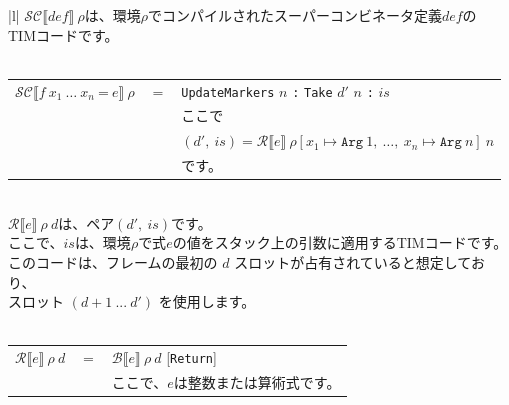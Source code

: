 \documentclass{jbook}
\begin{document}
\begin{tabular} {|l|} \hline
	$\mathcal{SC} \llbracket def \rrbracket ~ \rho$は、環境$\rho$でコンパイルされたスーパーコンビネータ定義$def$の \\
	TIMコードです。                                                                                                \\
	\\
	\begin{tabular}{r c l}
		$\mathcal{SC} \llbracket f ~ x_1 ~ \ldots ~ x_n ~ \texttt{=} ~ e \rrbracket ~ \rho$ & $=$ & \texttt{UpdateMarkers} $n$ \texttt{:} \texttt{Take} $d'$ $n$ \texttt{:} $is$                                                          \\
		                                                                                    &     & ここで                                                                                                                                \\
		                                                                                    &     & $(d', ~ is) = \mathcal{R} \llbracket e \rrbracket ~ \rho[x_1 \mapsto \texttt{Arg} ~ 1, ~ \ldots, ~ x_n \mapsto \texttt{Arg} ~ n] ~ n$ \\
		                                                                                    &     & です。
	\end{tabular}
	\\ \hline
	$\mathcal{R} \llbracket e \rrbracket ~ \rho ~ d$は、ペア$(d', ~ is)$です。                                     \\
	ここで、$is$は、環境$\rho$で式$e$の値をスタック上の引数に適用するTIMコードです。                               \\
	このコードは、フレームの最初の $d$ スロットが占有されていると想定しており、                                    \\
	スロット $(d + 1 ~ ... ~ d')$ を使用します。                                                                   \\
	\\
	\begin{tabular}{r c l}
		$\mathcal{R} \llbracket e \rrbracket ~ \rho ~ d$                 & $=$ & $\mathcal{B} \llbracket e \rrbracket ~ \rho ~ d$ [\texttt{Return}]                                                                            \\
		                                                                 &     & ここで、$e$は整数または算術式です。                                                                                                           \\

\end{tabular}
\end{tabular}
\end{document}
